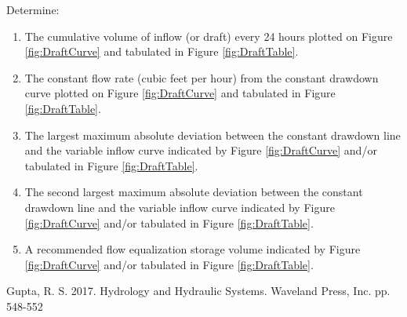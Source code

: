\documentclass[12pt]{article}
\begin{document}
\begin{enumerate}
Determine:
\begin{enumerate}
\item The cumulative volume of inflow (or draft) every 24 hours plotted on Figure \ref{fig:DraftCurve} and tabulated in Figure \ref{fig:DraftTable}.
\item The constant flow rate (cubic feet per hour) from the constant drawdown curve plotted on Figure \ref{fig:DraftCurve} and tabulated in Figure \ref{fig:DraftTable}.
\item The largest maximum absolute deviation between the constant drawdown line and the variable inflow curve indicated by Figure \ref{fig:DraftCurve} and/or tabulated in Figure \ref{fig:DraftTable}.
\item The second largest maximum absolute deviation between the constant drawdown line and the variable inflow curve indicated by Figure \ref{fig:DraftCurve} and/or tabulated in Figure \ref{fig:DraftTable}.
\item A recommended flow equalization storage volume indicated by Figure \ref{fig:DraftCurve} and/or tabulated in Figure \ref{fig:DraftTable}.
\end{enumerate}
\end{enumerate}
\begin{thebibliography}{}
%
Gupta, R. S. 2017. Hydrology and Hydraulic Systems. Waveland Press, Inc. pp. 548-552
%
%
\end{thebibliography}
\end{document}
